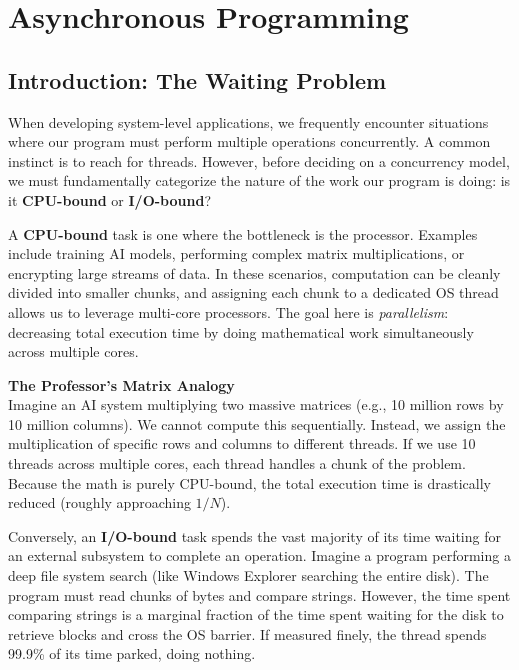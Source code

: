 \chapter{Asynchronous Programming}

\section{Introduction: The Waiting Problem}

When developing system-level applications, we frequently encounter situations where our program must perform multiple operations concurrently. A common instinct is to reach for threads. However, before deciding on a concurrency model, we must fundamentally categorize the nature of the work our program is doing: is it \textbf{CPU-bound} or \textbf{I/O-bound}?

A \textbf{CPU-bound} task is one where the bottleneck is the processor. Examples include training AI models, performing complex matrix multiplications, or encrypting large streams of data. In these scenarios, computation can be cleanly divided into smaller chunks, and assigning each chunk to a dedicated OS thread allows us to leverage multi-core processors. The goal here is \textit{parallelism}: decreasing total execution time by doing mathematical work simultaneously across multiple cores. 

\begin{insightbox}
\textbf{The Professor's Matrix Analogy} \\
Imagine an AI system multiplying two massive matrices (e.g., 10 million rows by 10 million columns). We cannot compute this sequentially. Instead, we assign the multiplication of specific rows and columns to different threads. If we use 10 threads across multiple cores, each thread handles a chunk of the problem. Because the math is purely CPU-bound, the total execution time is drastically reduced (roughly approaching $1/N$).
\end{insightbox}

Conversely, an \textbf{I/O-bound} task spends the vast majority of its time waiting for an external subsystem to complete an operation. Imagine a program performing a deep file system search (like Windows Explorer searching the entire disk). The program must read chunks of bytes and compare strings. However, the time spent comparing strings is a marginal fraction of the time spent waiting for the disk to retrieve blocks and cross the OS barrier. If measured finely, the thread spends 99.9\% of its time parked, doing nothing.


